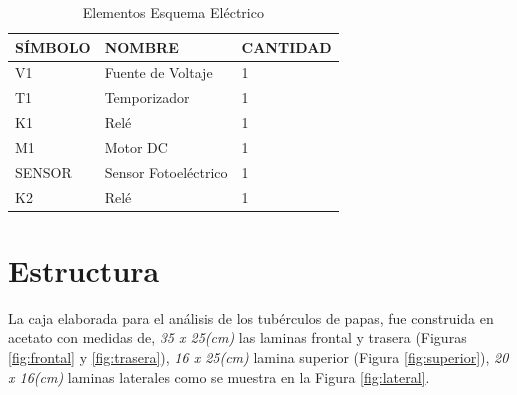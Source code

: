 \begin{table}[ht]
	\centering
	\begin{tabular}{|p{2cm}|p{5cm}||p{3cm}|}
		\hline
		SÍMBOLO & NOMBRE & CANTIDAD \\ 
		\hline
		V1 & Fuente de Voltaje & 1 \\
		\hline
		T1 & Temporizador & 1 \\
		\hline
		K1 & Relé & 1 \\
		\hline
		M1 & Motor DC & 1 \\
		\hline
		SENSOR & Sensor Fotoeléctrico & 1 \\
		\hline
		K2 & Relé & 1 \\
		\hline
	\end{tabular}	
	\caption{Elementos Esquema Eléctrico}
	\label{table:esquema}
\end{table}	

\newpage	
\section{Estructura}
La caja elaborada para el análisis de los tubérculos de papas, fue construida en acetato con medidas de, \textit{35 x 25(cm)} las laminas frontal y trasera (Figuras \ref{fig:frontal} y \ref{fig:trasera}), \textit{16 x 25(cm)} lamina superior (Figura \ref{fig:superior}), \textit{20 x 16(cm)} laminas laterales como se muestra en la Figura \ref{fig:lateral}.

